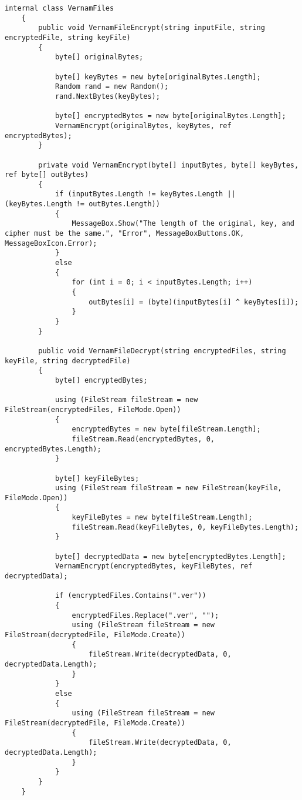 \begin{lstlisting}[caption=Vernam Cipher File Source Code]
internal class VernamFiles
    {
        public void VernamFileEncrypt(string inputFile, string encryptedFile, string keyFile)
        {
            byte[] originalBytes; 

            byte[] keyBytes = new byte[originalBytes.Length];                      
            Random rand = new Random();                                            
            rand.NextBytes(keyBytes);                                               

            byte[] encryptedBytes = new byte[originalBytes.Length];                
            VernamEncrypt(originalBytes, keyBytes, ref encryptedBytes);            
        }

        private void VernamEncrypt(byte[] inputBytes, byte[] keyBytes, ref byte[] outBytes)
        {
            if (inputBytes.Length != keyBytes.Length || (keyBytes.Length != outBytes.Length))
            {
                MessageBox.Show("The length of the original, key, and cipher must be the same.", "Error", MessageBoxButtons.OK, MessageBoxIcon.Error);
            }
            else
            {
                for (int i = 0; i < inputBytes.Length; i++)
                {
                    outBytes[i] = (byte)(inputBytes[i] ^ keyBytes[i]);
                }
            }
        }

        public void VernamFileDecrypt(string encryptedFiles, string keyFile, string decryptedFile)
        {
            byte[] encryptedBytes;

            using (FileStream fileStream = new FileStream(encryptedFiles, FileMode.Open))
            {
                encryptedBytes = new byte[fileStream.Length];
                fileStream.Read(encryptedBytes, 0, encryptedBytes.Length);
            }

            byte[] keyFileBytes;
            using (FileStream fileStream = new FileStream(keyFile, FileMode.Open))
            {
                keyFileBytes = new byte[fileStream.Length];
                fileStream.Read(keyFileBytes, 0, keyFileBytes.Length);
            }

            byte[] decryptedData = new byte[encryptedBytes.Length];
            VernamEncrypt(encryptedBytes, keyFileBytes, ref decryptedData);

            if (encryptedFiles.Contains(".ver"))
            {
                encryptedFiles.Replace(".ver", "");
                using (FileStream fileStream = new FileStream(decryptedFile, FileMode.Create))
                {
                    fileStream.Write(decryptedData, 0, decryptedData.Length);
                }
            }
            else
            {
                using (FileStream fileStream = new FileStream(decryptedFile, FileMode.Create))
                {
                    fileStream.Write(decryptedData, 0, decryptedData.Length);
                }
            }
        }
    }
\end{lstlisting}
